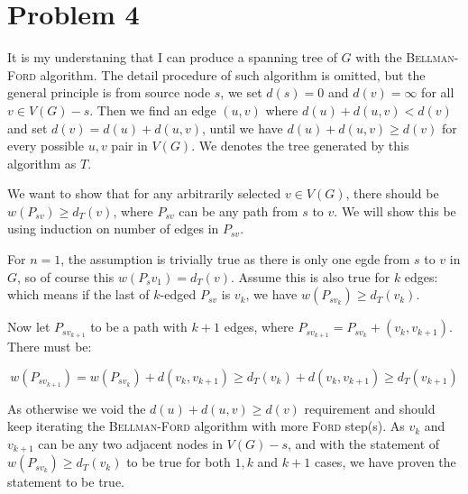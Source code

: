\documentclass[11pt]{article}
\begin{document}
\section*{Problem 4}

It is my understaning that I can produce a spanning tree of $G$ with the \textsc{Bellman-Ford} algorithm. The detail procedure of such algorithm is omitted, but the general principle is from source node $s$, we set $d(s) = 0$ and $d(v) = \infty$ for all $v \in V(G) - s$. Then we find an edge $(u, v)$ where $d(u) + d(u, v) < d(v)$ and set $d(v) = d(u) + d(u,v)$, until we have $d(u) + d(u, v) \geq d(v)$ for every possible $u, v$ pair in $V(G)$. We denotes the tree generated by this algorithm as $T$.\newline

We want to show that for any arbitrarily selected $v \in V(G)$, there should be $w(P_{sv}) \geq d_T(v)$, where $P_{sv}$ can be any path from $s$ to $v$.  We will show this be using induction on number of edges in $P_{sv}$.

For $n = 1$, the assumption is trivially true as there is only one egde from $s$ to $v$ in $G$, so of course this $w(P_sv_1) = d_T(v)$. Assume this is also true for $k$ edges: which means if the last of $k$-edged $P_{sv}$ is $v_k$, we have $w(P_{sv_k}) \geq d_T(v_k)$.

Now let $P_{sv_{k+1}}$ to be a path with $k+1$ edges, where $P_{sv_{k+1}} = P_{sv_k} + (v_k, v_{k+1})$. There must be:

\begin{equation*}
    w(P_{sv_{k+1}}) = w(P_{sv_k}) + d(v_k, v_{k+1}) \geq d_T(v_k) + d(v_k, v_{k+1}) \geq d_T(v_{k+1})
\end{equation*}

As otherwise we void the $d(u) + d(u, v) \geq d(v)$ requirement and should keep iterating the \textsc{Bellman-Ford} algorithm with more \textsc{Ford} step(s). As $v_k$ and $v_{k+1}$ can be any two adjacent nodes in $V(G) - s$, and with the statement of $w(P_{sv_k}) \geq d_T(v_k)$ to be true for both $1, k$ and $k+1$ cases, we have proven the statement to be true.



%
% 
% 
\end{document}
